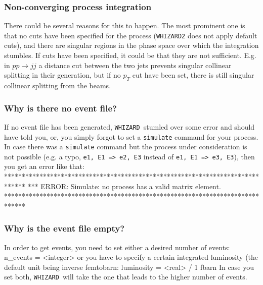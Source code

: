 \documentclass[12pt]{book}
\newenvironment{code}%
  {\begingroup\footnotesize
   \quote
   \Verbatim}%
  {\endVerbatim
   \endquote
   \endgroup\noindent}
\newenvironment{Code}%
  {\begingroup\footnotesize
   \quote
   \Verbatim[frame=single]}%
  {\endVerbatim
   \endquote
   \endgroup\noindent}
\newcommand{\ttt}[1]{\texttt{#1}}
\newcommand{\whizard}{\ttt{WHIZARD}}
\begin{document}
\subsubsection{Non-converging process integration}

There could be several reasons for this to happen. The most prominent
one is that no cuts have been specified for the process (\whizard\ttt{2}
does not apply default cuts), and there are singular regions in the
phase space over which the integration stumbles. If cuts have been
specified, it could be that they are not sufficient. E.g. in $pp \to
jj$ a distance cut between the two jets prevents singular collinear
splitting in their generation, but if no $p_T$ cut have been set,
there is still singular collinear splitting from the beams.

\subsubsection{Why is there no event file?}

If no event file has been generated, \whizard\ stumled over some error
and should have told you, or, you simply forgot to set a \ttt{simulate}
command for your process. In case there was a \ttt{simulate} command
but the process under consideration is not possible (e.g. a typo,
\ttt{e1, E1 => e2, E3} instead of \ttt{e1, E1 => e3, E3}), then you
get an error like that:
\begin{Code}
******************************************************************************
*** ERROR: Simulate: no process has a valid matrix element.
******************************************************************************
\end{Code}

\subsubsection{Why is the event file empty?}

In order to get events, you need to set either a desired number of
events:
\begin{code}
n_events = <integer>
\end{code}
or you have to specify a certain integrated luminosity (the default
unit being inverse femtobarn:
\begin{code}
luminosity = <real> / 1 fbarn
\end{code}
In case you set both, \whizard\ will take the one that leads to the
higher number of events.
\end{document}
